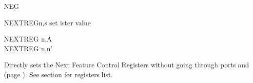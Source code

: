 \begin{basedescript}{
	\desclabelstyle{\multilinelabel}
	\desclabelwidth{3cm}}
\begin{DetailItem}{NEG}{}
		\begin{DetailEffects}[p]
			\FlagsNEG
		\end{DetailEffects}

		\begin{DetailEffectsFlags}
			\DetailFlagSF{\DetailFlagResultSign}
			\DetailFlagZF{\DetailFlagResultZero}
			\DetailFlagHF{\DetailFlagResultHalfBorrow}
		\end{DetailEffectsFlags}

		\begin{DetailTiming}
		\end{DetailTiming}

	\end{DetailItem}


	\begin{DetailItem}{NEXTREG}{n,s\ZXN}
		{set  ister value}
		{\SymNEXTREG{s}}

		\begin{DetailVariants}
			NEXTREG n,A\\
			NEXTREG n,n'
		\end{DetailVariants}

		Directly sets the Next Feature Control Registers without going through ports  and  (page ). See section  for registers list.

		\begin{DetailEffects}
			\FlagsNEXTREGna
		\end{DetailEffects}		
		
		\begin{DetailTiming}
			\DetailTime[r,A]{4}{17}
			\DetailTime[r,n]{5}{20}
		\end{DetailTiming}


\end{DetailItem}
\end{basedescript}
